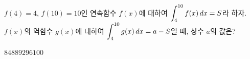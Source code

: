 $f(4)=4$, $f(10)=10$인 연속함수 $f(x)$에 대하여 $\displaystyle\int_{4}^{10} f(x)\mkern3mu dx=S$라 하자. $f(x)$의 역함수 $g(x)$에 대하여 $\displaystyle\int_{4}^{10} g(x)\mkern3mu dx=a-S$일 때, 상수 $a$의 값은?
\begin{choices32}{$84$}{$88$}{$92$}{$96$}{$100$}\end{choices32}
